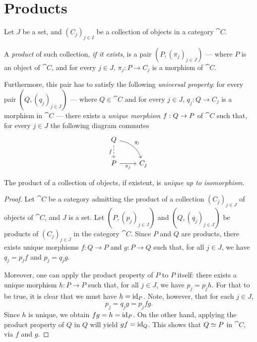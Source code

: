 \section{Products}

\begin{definition}[Product]
\label{def:product}
Let \(J\) be a set, and \((C_j)_{j \in I}\) be a
collection of objects in a category \(\cat C\).

A \emph{product} of such collection, \emph{if it exists}, is a pair
\((P, (\pi_j)_{j \in J})\) --- where \(P\) is an object of \(\cat C\), and for
every \(j \in J\), \(\pi_j: P \to C_j\) is a morphism of \(\cat C\).

Furthermore, this pair has to satisfy the following \emph{universal property}:
for every pair \((Q, (q_j)_{j \in J})\) --- where \(Q \in \cat C\) and for every
\(j \in J\), \(q_j: Q \to C_j\) is a morphism in \(\cat C\) --- there exists a
\emph{unique morphism} \(f: Q \to P\) of \(\cat C\) such that, for every
\(j \in J\) the following diagram commutes
\[
\begin{tikzcd}
Q \ar[rd, "q_j", bend left] \ar[d, dashed, "f"'] & \\
P \ar[r, "\pi_j"'] & C_j
\end{tikzcd}
\]
\end{definition}

\begin{proposition}[Uniqueness]
\label{prop:product-unique-up-to-iso}
The product of a collection of objects, if existent, is \emph{unique up to
  isomorphism}.
\end{proposition}

\begin{proof}
Let \(\cat C\) be a category admitting the product of a collection
\((C_j)_{j \in J}\) of objects of \(\cat C\), and \(J\) is a set. Let
\((P, (p_j)_{j \in J})\) and \((Q, (q_j)_{j \in J})\) be products of
\((C_j)_{j \in J}\) in the category \(\cat C\). Since \(P\) and \(Q\) are
products, there exists unique morphisms \(f: Q \to P\) and \(g: P \to Q\) such
that, for all \(j \in J\), we have \(q_j = p_j f\) and \(p_j = q_j g\).

Moreover, one can apply the product property of \(P\) to \(P\) itself: there
exists a unique morphism \(h: P \to P\) such that, for all \(j \in J\), we have
\(p_j = p_j h\). For that to be true, it is clear that we must have
\(h = \operatorname{id}_{P}\). Note, however, that for each \(j \in J\),
\[
p_j = q_j g = p_j f g.
\]
Since \(h\) is unique, we obtain \(f g = h = \operatorname{id}_P\).  On the other hand,
applying the product property of \(Q\) in \(Q\) will yield \(g f = \operatorname{id}_Q\). This
shows that \(Q \simeq P\) in \(\cat C\), via \(f\) and \(g\).
\end{proof}

